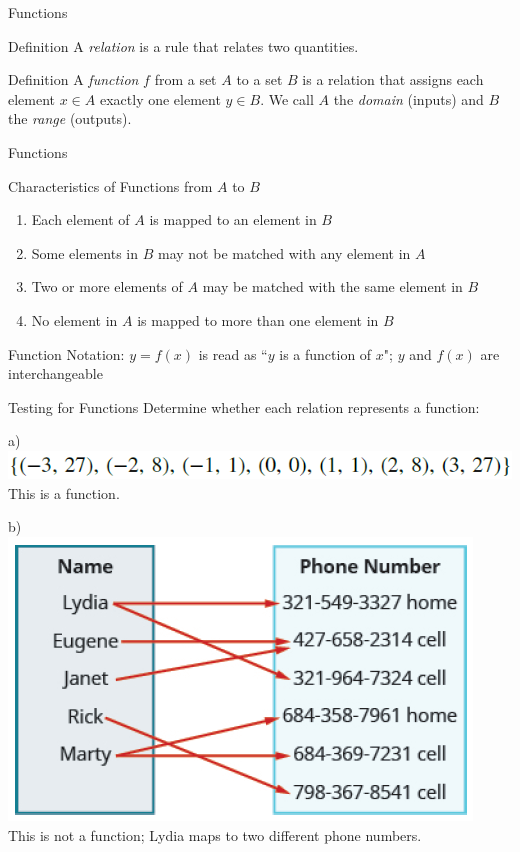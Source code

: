 \documentclass{beamer}
\begin{document}
\begin{frame}[t]{Functions}
\begin{block}{Definition}
A \textit{relation} is a rule that relates two quantities.
\end{block}

\begin{block}{Definition}
A \textit{function} $f$ from a set $A$ to a set $B$ is a relation that assigns each element $x \in A$ exactly one element $y \in B$. We call $A$ the \textit{domain} (inputs) and $B$ the \textit{range} (outputs).
\end{block}
\end{frame}

\begin{frame}[t]{Functions}
\begin{block}{Characteristics of Functions from $A$ to $B$}
\begin{enumerate}[1)]
\item Each element of $A$ is mapped to an element in $B$
\item Some elements in $B$ may not be matched with any element in $A$
\item Two or more elements of $A$ may be matched with the same element in $B$
\item No element in $A$ is mapped to more than one element in $B$
\end{enumerate}
\end{block}

Function Notation: $y = f(x)$ is read as ``$y$ is a function of $x$"; $y$ and $f(x)$ are interchangeable
\end{frame}

\begin{frame}[t]{Testing for Functions}
Determine whether each relation represents a function:

a) \includegraphics[scale=0.5]{Function1.png} \\
\pause This is a function. \vspace{12pt}

\pause b) \\
\includegraphics[scale=0.4]{Function2.png} \\
\pause This is not a function; Lydia maps to two different phone numbers.
\end{frame}
\end{document}
